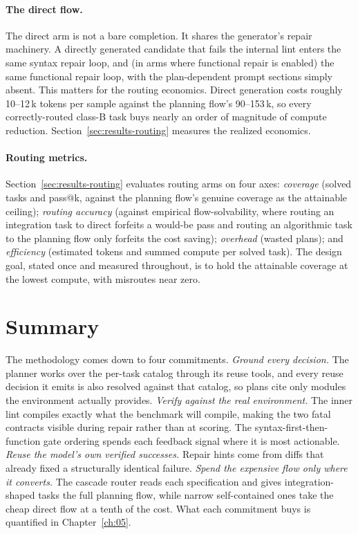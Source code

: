 \paragraph{The direct flow.}
The direct arm is not a bare completion. It shares the generator's repair
machinery. A directly generated candidate that fails the internal lint
enters the same syntax repair loop, and (in arms where functional repair is
enabled) the same functional repair loop, with the plan-dependent prompt
sections simply absent. This matters for the routing economics. Direct
generation costs roughly 10--12\,k tokens per sample against the planning flow's
90--153\,k, so every correctly-routed class-B task buys nearly an order of
magnitude of compute reduction. Section~\ref{sec:results-routing}
measures the realized economics.

\paragraph{Routing metrics.}
Section~\ref{sec:results-routing} evaluates routing arms on four axes:
\emph{coverage} (solved tasks and pass@k, against the planning flow's
genuine coverage as the attainable ceiling); \emph{routing accuracy}
(against empirical flow-solvability, where routing an integration task
to direct forfeits a would-be pass and routing an algorithmic task to
the planning flow only forfeits the cost saving); \emph{overhead} (wasted
plans); and \emph{efficiency} (estimated tokens and summed compute per
solved task). The design goal, stated once and measured throughout, is
to hold the attainable coverage at the lowest compute, with misroutes
near zero.

\section{Summary}

The methodology comes down to four commitments. \emph{Ground every
decision.} The planner works over the per-task catalog through its
reuse tools, and every reuse decision it emits is also resolved
against that catalog, so plans cite only modules the environment
actually provides. \emph{Verify against the real environment.} The inner
lint compiles exactly what the benchmark will compile, making the two
fatal contracts visible during repair rather than at scoring. The
syntax-first-then-function gate ordering spends each feedback signal
where it is most actionable. \emph{Reuse the model's own verified
successes.} Repair hints come from diffs that already fixed a
structurally identical failure. \emph{Spend the expensive flow only
where it converts.} The cascade router reads each specification and
gives integration-shaped tasks the full planning flow, while narrow
self-contained ones take the cheap direct flow at a tenth of the cost.
What each commitment buys is quantified in Chapter~\ref{ch:05}.
